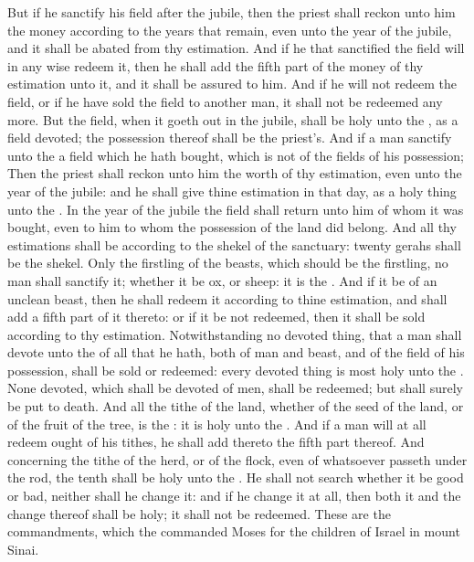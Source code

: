 \begin{biblechapter}
\verse But if he sanctify his field after the jubile, then the priest shall reckon unto him the money according to the years that remain, even unto the year of the jubile, and it shall be abated from thy estimation.
\verse And if he that sanctified the field will in any wise redeem it, then he shall add the fifth part of the money of thy estimation unto it, and it shall be assured to him.
\verse And if he will not redeem the field, or if he have sold the field to another man, it shall not be redeemed any more.
\verse But the field, when it goeth out in the jubile, shall be holy unto the \LORD, as a field devoted; the possession thereof shall be the priest's.
\verse And if a man sanctify unto the \LORD a field which he hath bought, which is not of the fields of his possession;
\verse Then the priest shall reckon unto him the worth of thy estimation, even unto the year of the jubile: and he shall give thine estimation in that day, as a holy thing unto the \LORD.
\verse In the year of the jubile the field shall return unto him of whom it was bought, even to him to whom the possession of the land did belong.
\verse And all thy estimations shall be according to the shekel of the sanctuary: twenty gerahs shall be the shekel.
\verse Only the firstling of the beasts, which should be the \LORDs firstling, no man shall sanctify it; whether it be ox, or sheep: it is the \LORDs.
\verse And if it be of an unclean beast, then he shall redeem it according to thine estimation, and shall add a fifth part of it thereto: or if it be not redeemed, then it shall be sold according to thy estimation.
\verse Notwithstanding no devoted thing, that a man shall devote unto the \LORD of all that he hath, both of man and beast, and of the field of his possession, shall be sold or redeemed: every devoted thing is most holy unto the \LORD.
\verse None devoted, which shall be devoted of men, shall be redeemed; but shall surely be put to death.
\verse And all the tithe of the land, whether of the seed of the land, or of the fruit of the tree, is the \LORDs: it is holy unto the \LORD.
\verse And if a man will at all redeem ought of his tithes, he shall add thereto the fifth part thereof.
\verse And concerning the tithe of the herd, or of the flock, even of whatsoever passeth under the rod, the tenth shall be holy unto the \LORD.
\verse He shall not search whether it be good or bad, neither shall he change it: and if he change it at all, then both it and the change thereof shall be holy; it shall not be redeemed.
\verse These are the commandments, which the \LORD commanded Moses for the children of Israel in mount Sinai.
\end{biblechapter}
